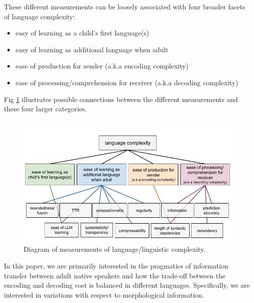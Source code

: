 \documentclass[a4paper]{article}
\begin{document}
These different measurements can be loosely associated with four broader facets of language complexity:

\begin{itemize}
\item easy of learning as a child's first language(s)
\item easy of learning as additional language when adult
\item ease of production for sender (a.k.a encoding complexity)
\item ease of processing/comprehension for receiver (a.k.a decoding complexity)
\end{itemize}

Fig \ref{fig:metrics_diagram} illustrates possible connections between the different measurements and these four larger categories.

\begin{figure}[ht]
    \centering
    \includegraphics[width=1.2\textwidth]{latex/graphics/ud_complexity_metrics.png} %
    \caption{Diagram of measurements of language/linguistic complexity.}
    \label{fig:metrics_diagram}
\end{figure}

In this paper, we are primarily interested in the pragmatics of information transfer between adult native speakers and how the trade-off between the encoding and decoding cost is balanced in different languages. Specifically, we are interested in variations with respect to morphological information.



\end{document}

